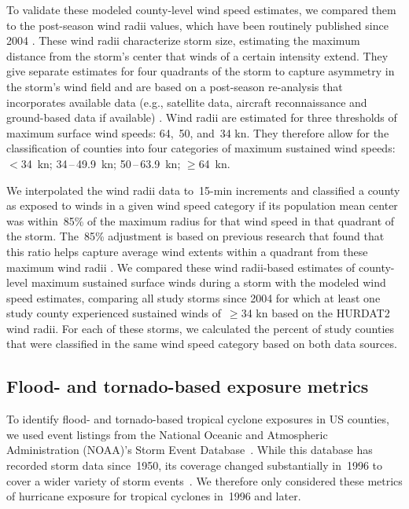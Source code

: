 To validate these modeled county-level wind speed estimates, we compared them
to the  post-season wind radii values, which have been routinely published
since 2004 \parencite{knaff2016using}. These wind radii characterize storm
size, estimating the maximum distance from the storm's center that winds of a
certain intensity extend. They give separate estimates for four quadrants of
the storm to capture asymmetry in the storm's wind field and are 
based on a post-season
re-analysis that incorporates available data (e.g., satellite data, aircraft
reconnaissance and ground-based data if available)
\parencite{knaff2016using}. Wind radii are estimated
for three thresholds of maximum surface wind speeds: 64,~50, and~34 \si{\knot}.
They therefore allow for the classification of counties into four categories of
maximum sustained wind speeds: $<$34~\si{\knot}; 34\,--\,49.9~\si{\knot};
50\,--\,63.9~\si{\knot}; $\ge$64~\si{\knot}. 

We interpolated the wind radii data to~15-\si{\minute} increments and
classified a county as exposed to winds in a given wind speed category if its
population mean center was within~85\% of the maximum radius for that wind
speed in that quadrant of the storm. The~85\% adjustment is based on previous
research that found that this ratio helps capture average wind extents within a
quadrant from these maximum wind radii \parencite{knaff2016using}.  We compared
these wind radii-based estimates of county-level maximum sustained surface
winds during a storm with the modeled wind speed estimates, comparing all study
storms since 2004 for which at least one study county experienced sustained
winds of~$\ge$34 \si{\knot} based on the \ac{HURDAT2} wind radii. For each of
these storms, we calculated the percent of study counties that were classified
in the same wind speed category based on both data sources.

\subsection*{Flood- and tornado-based exposure metrics}

To identify flood- and tornado-based tropical cyclone exposures in \ac{US}
counties, we used event listings from the National Oceanic and Atmospheric
Administration (NOAA)'s Storm Event Database~\parencite{stormevents}. While
this database has recorded storm data since~1950, its coverage changed
substantially in~1996 to cover a wider variety of storm
events~\parencite{stormevents}. We therefore only considered these metrics of
hurricane exposure for tropical cyclones in~1996 and later.

